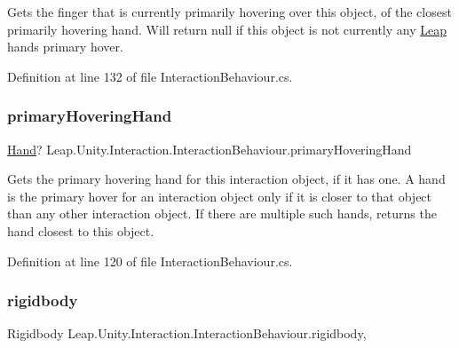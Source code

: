 Gets the finger that is currently primarily hovering over this object, of the closest primarily hovering hand. Will return null if this object is not currently any \mbox{\hyperlink{namespace_leap_1_1_unity_1_1_leap}{Leap}} hand\textquotesingle{}s primary hover. 



Definition at line 132 of file Interaction\+Behaviour.\+cs.

\mbox{\label{class_leap_1_1_unity_1_1_interaction_1_1_interaction_behaviour_a856190a94c40baea953a74cd15dedc29}} 
\subsubsection{\texorpdfstring{primaryHoveringHand}{primaryHoveringHand}}
{\footnotesize\ttfamily \mbox{\hyperlink{class_leap_1_1_hand}{Hand}}? Leap.\+Unity.\+Interaction.\+Interaction\+Behaviour.\+primary\+Hovering\+Hand\hspace{0.3cm}{\ttfamily [get]}}



Gets the primary hovering hand for this interaction object, if it has one. A hand is the primary hover for an interaction object only if it is closer to that object than any other interaction object. If there are multiple such hands, returns the hand closest to this object. 



Definition at line 120 of file Interaction\+Behaviour.\+cs.

\mbox{\label{class_leap_1_1_unity_1_1_interaction_1_1_interaction_behaviour_a4f54f1794944882d8cf51bd641a5341c}} 
\subsubsection{\texorpdfstring{rigidbody}{rigidbody}}
{\footnotesize\ttfamily Rigidbody Leap.\+Unity.\+Interaction.\+Interaction\+Behaviour.\+rigidbody\hspace{0.3cm}{\ttfamily [get]}, {}}



